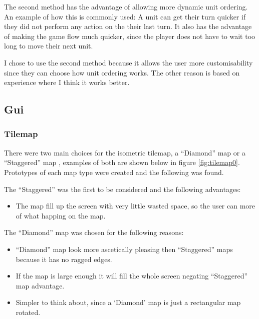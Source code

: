 The second method has the advantage of allowing more dynamic unit ordering.  An example of how this is commonly used: A unit can get their turn quicker if they did not perform any action on the their last turn. It also has the advantage of making the game flow much quicker, since the player does not have to wait too long to move their next unit. 

I chose to use the second method because it allows the user more customisability since they can choose how unit ordering works. The other reason is based on experience where I think it works better.

\subsection{Gui}

\subsubsection{Tilemap}
\label{sub:tilemap}

There were two main choices for the isometric tilemap, a ``Diamond'' map or a  ``Staggered'' map \cite{isometric_game_programming}, examples of both are shown below in figure \ref{fig:tilemap0}. Prototypes of each map type were created and the following was found.  

The ``Staggered'' was the first to be considered and the following advantages:
\begin{itemize}
	\item The map fill up the screen with very little wasted space, so the user can more of what happing on the map. 
\end{itemize}

The ``Diamond'' map was chosen for the following reasons:
\begin{itemize}
	\item ``Diamond'' map look more ascetically pleasing then ``Staggered'' maps because it has no ragged edges.
	\item  If the map is large enough it will fill the whole screen negating ``Staggered'' map advantage.
	\item  Simpler to think about, since a `Diamond' map is just a rectangular map rotated.
\end{itemize}


